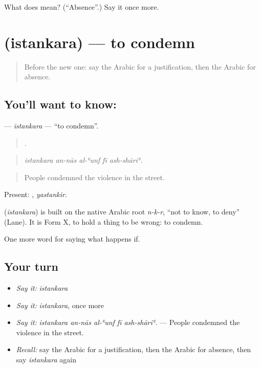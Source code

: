 \begin{tcolorbox}[breakable,colback=teal!4,colframe=teal!35!black,title={Before you move on}]
What does  mean? (\textquotedblleft{}Absence\textquotedblright{}.) Say it once more.
\end{tcolorbox}
\section[\texorpdfstring{\ar{استنكر} (istankara)}{استنكر (istankara)}]{ (istankara) — to condemn}

\label{lesson:AR-C422-istankara}



\begin{quote}
Before the new one: say the Arabic for a justification, then the Arabic for absence.
\end{quote}

\subsection*{You'll want to know: }
\textbf{} — \emph{istankara} — \textquotedblleft{}to condemn\textquotedblright{}.

\begin{quote}
    .
\end{quote}

\begin{quote}
\emph{istankara an-nās al-ʿunf fī ash-shāriʿ.}
\end{quote}

\begin{quote}
People condemned the violence in the street.
\end{quote}

Present: , \emph{yastankir}.

\begin{cousinweb}
\textbf{} (\emph{istankara}) is built on the native Arabic root \emph{n-k-r}, \textquotedblleft{}not to know, to deny\textquotedblright{} (Lane). It is Form X, to hold a thing to be wrong: to condemn.
\end{cousinweb}

\begin{grammarlens}[title={What you've built}]
One more word for saying what happens if.
\end{grammarlens}

\subsection*{Your turn}
\begin{itemize}
\raggedright
  \item \emph{Say it:} \emph{istankara}
  \item \emph{Say it:} \emph{istankara}, once more
  \item \emph{Say it:} \emph{istankara an-nās al-ʿunf fī ash-shāriʿ.} — People condemned the violence in the street.
  \item \emph{Recall:} say the Arabic for a justification, then the Arabic for absence, then say \emph{istankara} again
\end{itemize}

